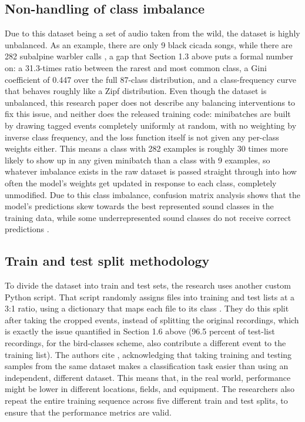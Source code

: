 \documentclass[11pt]{article}
\begin{document}
\subsection{Non-handling of class imbalance}

Due to this dataset being a set of audio taken from the wild, the dataset is highly unbalanced. As an example, there are only 9 black cicada songs, while there are 282 subalpine warbler calls \citep{bravosanchez2021}, a gap that Section 1.3 above puts a formal number on: a 31.3-times ratio between the rarest and most common class, a Gini coefficient of 0.447 over the full 87-class distribution, and a class-frequency curve that behaves roughly like a Zipf distribution. Even though the dataset is unbalanced, this research paper does not describe any balancing interventions to fix this issue, and neither does the released training code: minibatches are built by drawing tagged events completely uniformly at random, with no weighting by inverse class frequency, and the loss function itself is not given any per-class weights either. This means a class with 282 examples is roughly 30 times more likely to show up in any given minibatch than a class with 9 examples, so whatever imbalance exists in the raw dataset is passed straight through into how often the model's weights get updated in response to each class, completely unmodified. Due to this class imbalance, confusion matrix analysis shows that the model's predictions skew towards the best represented sound classes in the training data, while some underrepresented sound classes do not receive correct predictions \citep{bravosanchez2021}.

\subsection{Train and test split methodology}

To divide the dataset into train and test sets, the research uses another custom Python script. That script randomly assigns files into training and test lists at a 3:1 ratio, using a dictionary that maps each file to its class \citep{bravosanchez2021}. They do this split after taking the cropped events, instead of splitting the original recordings, which is exactly the issue quantified in Section 1.6 above (96.5 percent of test-list recordings, for the bird-classes scheme, also contribute a different event to the training list). The authors cite \citet{xie2020}, acknowledging that taking training and testing samples from the same dataset makes a classification task easier than using an independent, different dataset. This means that, in the real world, performance might be lower in different locations, fields, and equipment. The researchers also repeat the entire training sequence across five different train and test splits, to ensure that the performance metrics are valid.
\end{document}
